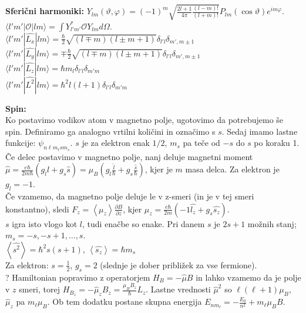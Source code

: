 \documentclass[a4paper, oneside, 12pt]{article}
\theoremstyle{definition}
\begin{document}
\textbf{Sferični harmoniki:} $Y_{lm}(\vartheta, \varphi) = (-1)^m \sqrt{\frac{2l+1}{4 \pi} \frac{(l-m)!}{(l+m)!}} P_{lm}(\cos \vartheta) e^{im\varphi}$.\\
$\langle l' m' |\mathcal{O}| lm\rangle = \int Y_{l'm'}^* \mathcal{O} Y_{lm} d\Omega $.\\
$\langle l' m' |\hat{L_x}| lm\rangle = \frac{\hbar}{2} \sqrt{(l \mp m) (l \pm m + 1)} \delta_{l' l} \delta_{m', m\pm1}$\\
$\langle l' m' |\hat{L_y}| lm\rangle = \mp \frac{\hbar}{2} \sqrt{(l \mp m) (l \pm m + 1)} \delta_{l' l} \delta_{m', m\pm1}$\\
$\langle l' m' |\hat{L_z}| lm\rangle = \hbar m_l \delta_{l'l} \delta_{m' m}$\\
$\langle l' m' |\hat{L^2}| lm\rangle = \hbar^2 l (l+1) \delta_{l'l} \delta_{m' m}$

\textbf{Spin:} \\
Ko postavimo vodikov atom v magnetno polje, ugotovimo da potrebujemo še spin.
Definiramo ga analogno vrtilni količini in označimo s $s$. Sedaj imamo lastne funkcije:
$\psi_{n\ell m_\ell s m_s}$. $s$ je za elektron enak $1/2$, $m_s$ pa teče od $-s$ do $s$ po koraku 1.\\
Če delec postavimo v magnetno polje, nanj deluje magnetni moment
$\hat{\mu} = \frac{e\hbar}{2 m \hbar} (g_l \hat{l} + g_s \hat{s}) = \mu_B (g_l \frac{\hat{l}}{\hbar} + g_s \frac{\hat{s}}{\hbar})$, kjer je $m$ masa delca. Za elektron je $g_l = -1$. \\
Če vzamemo, da magnetno polje deluje le v z-smeri (in je v tej smeri konstantno), sledi $F_z = \left\langle \mu_z\right\rangle \frac{\partial B}{\partial z}$, kjer $\mu_z = \frac{e \hbar}{2 m}(-1 \hat{l_z} + g_s \hat{s_z})$.\\
$s$ igra isto vlogo kot $l$, tudi enačbe so enake. Pri danem $s$ je $2s+1$ možnih stanj; $m_s = -s, -s+1,\ldots, s$. \\
$\left\langle \hat{s^2}\right\rangle = \hbar^2 s (s+1)$, $\left\langle \hat{s_z}\right\rangle = \hbar m_s$\\
Za elektron: $s = \frac{1}{2}$, $g_s = 2$ (slednje je dober približek za vse fermione).\\
? Hamiltonian popravimo z operatorjem $H_B = -\hat{\mu}B$ in lahko vzamemo da je polje v $z$ smeri, torej
$H_{B_z} = -\hat{\mu}_zB_z = \frac{\mu_B B_z}{\hbar}L_z$.
Lastne vrednosti $\hat{\mu}^2$ so $\ell(\ell+1)\mu_B$, $\hat{\mu}_z$ pa $m_{\ell} \mu_B$.
Ob tem dodatku postane skupna energija
$E_{nm_\ell} = -\frac{E_0}{n^2} + m_\ell \mu_B B$.\\
\end{document}
